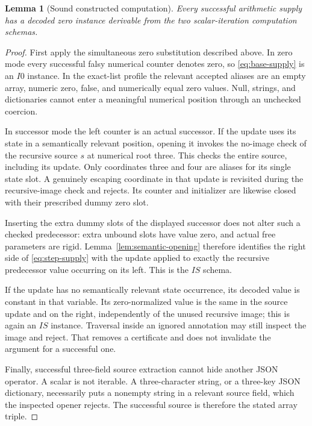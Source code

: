 \documentclass[11pt,letterpaper]{article}
\newtheorem{lemma}[theorem]{Lemma}
\theoremstyle{definition}\newtheorem{definition}[theorem]{Definition}
\theoremstyle{remark}\newtheorem{remark}[theorem]{Remark}
\begin{document}
\begin{lemma}[Sound constructed computation]
\label{lem:constructed-supply}
Every successful arithmetic supply has a decoded zero instance
derivable from the two scalar-iteration computation schemas.
\end{lemma}

\begin{proof}
First apply the simultaneous zero substitution described above.  In
zero mode every successful falsy numerical counter denotes zero, so
\eqref{eq:base-supply} is an $I0$ instance.  In the exact-list profile
the relevant accepted aliases are an empty array, numeric zero, false,
and numerically equal zero values.  Null, strings, and dictionaries
cannot enter a meaningful numerical position through an unchecked
coercion.

In successor mode the left counter is an actual successor.  If the
update uses its state in a semantically relevant position, opening it
invokes the no-image check of the recursive source $s$ at numerical
root three.  This checks the entire source, including its update.
Only coordinates three and four are aliases for its single state slot.
A genuinely escaping coordinate in that update is revisited during
the recursive-image check and rejects.  Its counter and initializer
are likewise closed with their prescribed dummy zero slot.

Inserting the extra dummy slots of the displayed successor does not
alter such a checked predecessor: extra unbound slots have value zero,
and actual free parameters are rigid.  Lemma~\ref{lem:semantic-opening}
therefore identifies the right side of \eqref{eq:step-supply} with the
update applied to exactly the recursive predecessor value occurring
on its left.  This is the $IS$ schema.

If the update has no semantically relevant state occurrence, its
decoded value is constant in that variable.  Its zero-normalized value
is the same in the source update and on the right, independently of
the unused recursive image; this is again an $IS$ instance.  Traversal
inside an ignored annotation may still inspect the image and reject.
That removes a certificate and does not invalidate the argument for a
successful one.

Finally, successful three-field source extraction cannot hide another
JSON operator.  A scalar is not iterable.  A three-character string,
or a three-key JSON dictionary, necessarily puts a nonempty string in
a relevant source field, which the inspected opener rejects.  The
successful source is therefore the stated array triple.
\end{proof}
\end{document}

